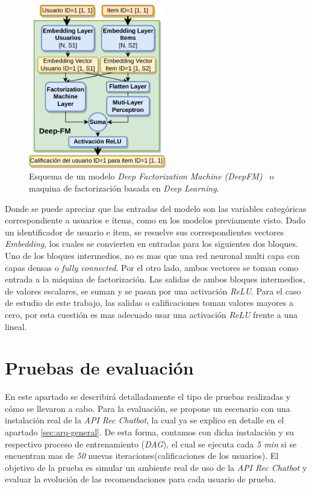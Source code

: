 \documentclass[11pt,a4paper,twoside]{thesis}
\begin{document}
\begin{figure}[h!]
	\centering
	\includegraphics[width=6cm]{./images/Deep-MF.png}
	\caption{
		Esquema de un modelo \textit{Deep Factorization Machine (DeepFM)~\cite{dfmpaper, didldfm}} o maquina
		de factorización basada en \textit{Deep Learning}.
	}
	\label{fig:DeepMFModel}
\end{figure}

Donde se puede apreciar que las entradas del modelo son las variables
categóricas correspondiente a usuarios e ítems, como en los modelos previamente
visto. Dado un identificador de usuario e ítem, se resuelve sus correspondientes
vectores \textit{Embedding}, los cuales se convierten en entradas para los
siguientes dos bloques. Uno de los bloques intermedios, no es mas que una red
neuronal multi capa con capas densas o \textit{fully connected}. Por el otro
lado, ambos vectores se toman como entrada a la máquina de factorización. Las
salidas de ambos bloques intermedios, de valores escalares, se suman y se pasan
por una activación \textit{ReLU}. Para el caso de estudio de este trabajo, las
salidas o calificaciones toman valores mayores a cero, por esta cuestión es mas
adecuado usar una activación \textit{ReLU} frente a una lineal.


\chapter{Pruebas de evaluación}
\label{chap:evaluacion-modelo}

En este apartado se describirá detalladamente el tipo de pruebas realizadas y cómo se llevaron a cabo. Para la evaluación, se propone un escenario con una instalación real de la \textit{API Rec Chatbot}, la cual ya se explico en detalle en el apartado \ref{sec:arq-general}. De esta forma, contamos con dicha instalación y su respectivo proceso de entrenamiento (\textit{DAG}), el cual se ejecuta cada \textit{5 min} si se encuentran mas de \textit{50} nuevas iteraciones(calificaciones de los usuarios). El objetivo de la prueba es simular un ambiente real de uso de la \textit{API Rec Chatbot} y evaluar la evolución de las recomendaciones para cada usuario de prueba.
\end{document}
